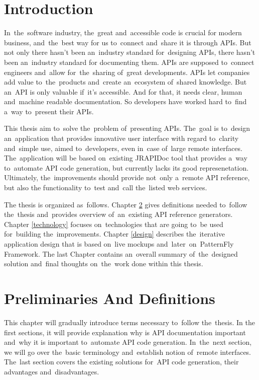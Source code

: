 
\chapter{Introduction}
In~the~software industry, the~great and~accessible code is crucial for modern
business, and~the~best way for us to~connect and~share it is through APIs. But
not only there hasn't been an~industry standard for~designing APIs, there hasn't
been an~industry standard for documenting them. APIs are supposed to~connect
engineers and~allow for~the~sharing of~great developments. APIs let companies
add value to~the~products and~create an~ecosystem of~shared knowledge. But
an~API is only valuable if~it's accessible. And for that, it needs clear, human
and~machine readable documentation. So developers have worked hard to~find a~way
to~present their APIs.

This thesis aim to~solve the~problem of~presenting APIs. The~goal is to~design
an~application that provides innovative user interface with regard to~clarity
and~simple use, aimed to~developers, even in~case of~large remote interfaces.
The~application will be based on~existing JRAPIDoc \cite{JRAPIDoc} tool that
provides a~way to~automate API code generation, but currently lacks its good
represenetation. Ultimately, the~improvements should provide not~only
a~remote API reference, but also the functionality to~test and~call the~listed
web services.

The thesis is organized as~follows. Chapter \ref{preliminaries} gives
definitions needed to~follow the~thesis and~provides overview of~an~existing API
reference generators. Chapter \ref{technology} focuses on~technologies that are
going to~be used for~building the~improvements. Chapter
\ref{design} describes the~iterative application design that is based on~live
mockups and~later~on~PatternFly Framework. The last Chapter contains an~overall summary
of~the~designed solution and~final thoughts on~the~work done within this thesis.

\chapter{Preliminaries And Definitions}
\label{preliminaries}
This chapter will gradually introduce terms necessary to~follow the~thesis.
In the first sections, it will provide explanation why is API documentation
important and~why it is important to~automate API code generation. In~the~next
section, we will go over the~basic terminology and~establish notion of~remote
interfaces. The~last section covers the existing solutions for~API code
generation, their advantages and~disadvantages.

